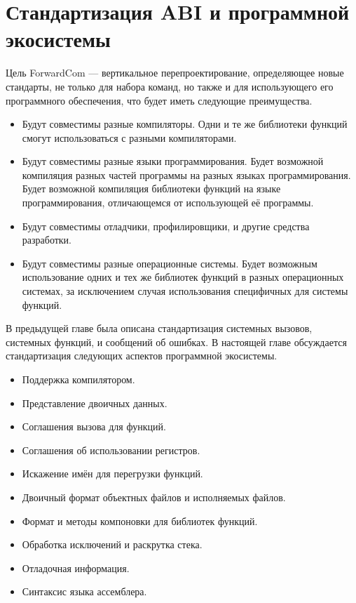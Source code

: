 \documentclass[forwardcom.tex]{subfiles}
\begin{document}
\chapter{Стандартизация ABI и программной экосистемы} \label{StandardizationOfAbi}
Цель ForwardCom --- вертикальное перепроектирование, определяющее новые стандарты, не только для набора команд, но также и для использующего его программного обеспечения, что будет иметь следующие преимущества.
\begin{itemize}
\item Будут совместимы разные компиляторы. Одни и те же библиотеки функций смогут использоваться с разными компиляторами.

\item Будут совместимы разные языки программирования. Будет возможной компиляция разных частей программы на разных языках программирования. Будет возможной компиляция библиотеки функций на языке программирования, отличающемся от использующей её программы.

\item Будут совместимы отладчики, профилировщики, и другие средства разработки.

\item Будут совместимы разные операционные системы. Будет возможным использование одних и тех же библиотек функций в разных операционных системах, за исключением случая использования специфичных для системы функций.
\end{itemize}

В предыдущей главе была описана стандартизация системных вызовов, системных функций, и сообщений об ошибках. В настоящей главе обсуждается стандартизация следующих аспектов программной экосистемы.
\begin{itemize}
\item Поддержка компилятором.

\item Представление двоичных данных.

\item Соглашения вызова для функций. 

\item Соглашения об использовании регистров.

\item Искажение имён для перегрузки функций.

\item Двоичный формат объектных файлов и исполняемых файлов.

\item Формат и методы компоновки для библиотек функций.

\item Обработка исключений и раскрутка стека.

\item Отладочная информация.

\item Синтаксис языка ассемблера.
\end{itemize}
\end{document}
